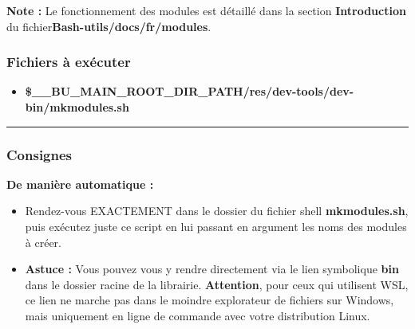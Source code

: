 \documentclass[a4paper,10pt]{article}
\begin{document}
\textbf{Note :} Le fonctionnement des modules est détaillé dans la section \textbf{\color{red}Introduction} du fichier\linebreak \textbf{\color{lime}Bash-utils/docs/fr/modules}.

\color{blue}
\subsubsection{Fichiers à exécuter}\color{white}

\begin{itemize}
    \item \textbf{\color{orange}\$\_\_BU\_MAIN\_ROOT\_DIR\_PATH\color{lime}/res/dev-tools/dev-bin/mkmodules.sh}\\[1\baselineskip]
\end{itemize}



\color{blue}\par\noindent\rule{\textwidth}{0.4pt}\color{white}

\color{blue}
\subsubsection{Consignes}\color{white}

\textbf{De manière automatique :}
\begin{itemize}
    \item Rendez-vous EXACTEMENT dans le dossier du fichier shell \textbf{\color{lime}mkmodules.sh}, puis exécutez juste\linebreak
    ce script en lui passant en argument les noms des modules à créer.\\[1\baselineskip]

    \item \textbf{Astuce :} Vous pouvez vous y rendre directement via le lien symbolique \textbf{\color{lime}bin} dans le dossier racine de la librairie. \textbf{Attention}, pour ceux qui utilisent WSL, ce lien ne marche pas dans le moindre explorateur de fichiers sur Windows, mais uniquement en ligne de commande avec votre distribution Linux.\\[1\baselineskip]
\end{itemize}
\end{document}

